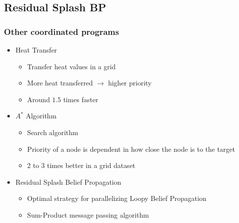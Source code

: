 \documentclass{beamer}
\begin{document}
\subsection{Residual Splash BP}

\begin{frame}[fragile]
   \frametitle{Other coordinated programs}
   \begin{itemize}
      \item Heat Transfer
      \begin{itemize}
         \item Transfer heat values in a grid
         \item More heat transferred $\rightarrow$ higher priority
         \item Around $1.5$ times faster
      \end{itemize}
      \item $A^{*}$ Algorithm
      \begin{itemize}
         \item Search algorithm
         \item Priority of a node is dependent in how close the node is to the target
         \item 2 to 3 times better in a grid dataset
      \end{itemize}
      \item Residual Splash Belief Propagation~\cite{Gonzalez+al:aistats09paraml}
      \begin{itemize}
         \item Optimal strategy for parallelizing Loopy Belief Propagation~\cite{Murphy99loopybelief}
         \item Sum-Product message passing algorithm
      \end{itemize}
   \end{itemize}
\end{frame}
\end{document}

